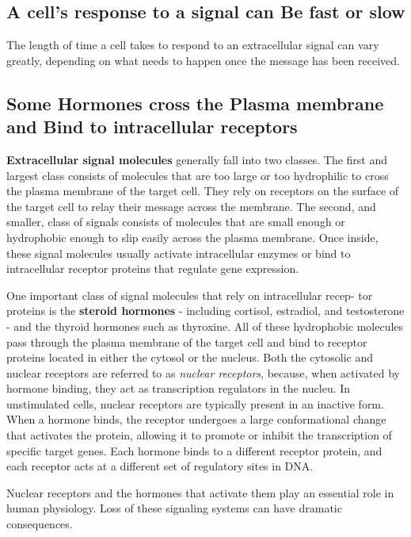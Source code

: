 \subsection{A cell’s response to a signal can Be fast or slow}

The length of time a cell takes to respond to an extracellular signal can
vary greatly, depending on what needs to happen once the message has
been received.

\subsection{Some Hormones cross the Plasma membrane and Bind to intracellular receptors}

\textbf{Extracellular signal molecules} generally fall into two classes. The first
and largest class consists of molecules that are too large or too hydrophilic
to cross the plasma membrane of the target cell. They rely on receptors
on the surface of the target cell to relay their message across the membrane. 
The second, and smaller, class of signals consists
of molecules that are small enough or hydrophobic enough to slip easily 
across the plasma membrane. Once inside, these signal molecules
usually activate intracellular enzymes or bind to intracellular receptor
proteins that regulate gene expression.

One important class of signal molecules that rely on intracellular recep-
tor proteins is the \textbf{steroid hormones} - including cortisol, estradiol, and
testosterone - and the thyroid hormones such as thyroxine. 
All of these hydrophobic molecules pass through the plasma membrane
of the target cell and bind to receptor proteins located in either the cytosol
or the nucleus. Both the cytosolic and nuclear receptors are referred to
as \textit{nuclear receptors}, because, when activated by hormone binding, they
act as transcription regulators in the nucleu. In
unstimulated cells, nuclear receptors are typically present in an inactive
form. When a hormone binds, the receptor undergoes a large conformational 
change that activates the protein, allowing it to promote or inhibit
the transcription of specific target genes.
Each hormone binds to a different receptor protein, and each receptor acts 
at a different set of regulatory sites in DNA.

Nuclear receptors and the hormones that activate them play an essential
role in human physiology. Loss of these signaling
systems can have dramatic consequences.

